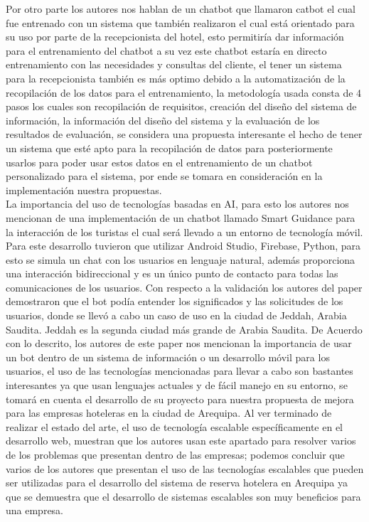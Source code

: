 \documentclass[12pt,a4paper,oneside]{article}
\begin{document}
    Por otro parte los autores nos hablan de un chatbot que llamaron catbot el cual fue entrenado  con un sistema que también realizaron el cual está orientado para su uso por parte de la recepcionista del hotel, esto permitiría dar información para el entrenamiento del chatbot a su vez este chatbot estaría en directo entrenamiento con las necesidades y consultas del cliente, el tener un sistema para la recepcionista también es más optimo debido a la automatización de la recopilación de los datos para el entrenamiento, la metodología usada consta de 4 pasos los cuales son recopilación de requisitos, creación del diseño del sistema de información, la información del diseño del sistema y la evaluación de los resultados de evaluación, se considera una propuesta interesante el hecho de tener un sistema que esté apto para la recopilación de datos para posteriormente usarlos para poder usar estos datos en el entrenamiento de un chatbot personalizado para el sistema, por ende se tomara en consideración en la implementación nuestra propuestas.\\
    La importancia del uso de tecnologías basadas en AI, para esto los autores nos mencionan de una implementación de un chatbot llamado Smart Guidance para la interacción de los turistas el cual será llevado a un entorno de tecnología móvil. Para este desarrollo tuvieron que utilizar Android Studio, Firebase, Python, para esto se simula un chat con los usuarios en lenguaje natural, además proporciona una interacción bidireccional y es un único punto de contacto para todas las comunicaciones de los usuarios. Con respecto a la validación los autores del paper demostraron que el bot podía entender los significados y las solicitudes de los usuarios, donde se llevó a cabo un caso de uso en la ciudad de Jeddah, Arabia Saudita. Jeddah es la segunda ciudad más grande de Arabia Saudita. De Acuerdo con lo descrito, los autores de este paper nos mencionan la importancia de usar un bot dentro de un sistema de información o un desarrollo móvil para los usuarios, el uso de las tecnologías mencionadas para llevar a cabo son bastantes interesantes ya que usan lenguajes actuales y de fácil manejo en su entorno, se tomará en cuenta el desarrollo de su proyecto para nuestra propuesta de mejora para las empresas hoteleras en la ciudad de Arequipa.
    Al ver terminado de realizar el estado del arte, el uso de tecnología escalable específicamente  en el desarrollo web, muestran que los autores usan este apartado para resolver varios de los problemas que presentan dentro de las empresas; podemos concluir que varios de los autores que presentan el uso de las tecnologías escalables que pueden ser utilizadas para el desarrollo del sistema de reserva hotelera en Arequipa ya que se demuestra que el desarrollo de sistemas escalables son muy beneficios para una empresa. 
\end{document}
